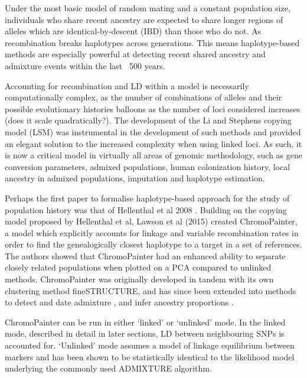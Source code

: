 

Under the most basic model of random mating and a constant population size, individuals who share recent ancestry are expected to share longer regions of alleles which are identical-by-descent (IBD) than those who do not. As recombination breaks haplotypes across generations. This means haplotype-based methods are especially powerful at detecting recent shared ancestry and admixture events within the last ~500 years.
 
Accounting for recombination and LD within a model is necessarily computationally complex, as the number of combinations of alleles and their possible evolutionary histories balloons as the number of loci considered increases (does it scale quadratically?). The development of the Li and Stephens copying model (LSM) \cite{Li2003} was instrumental in the development of such methods \cite{song2016li} and provided an elegant solution to the increased complexity when using linked loci. As such, it is now a critical model in virtually all areas of genomic methodology, such as gene conversion parameters, admixed populations, human colonization history, local ancestry in admixed populations, imputation and haplotype estimation. 

Perhaps the first paper to formalise  haplotype-based approach for the study of population history was that of Hellenthal et al 2008 \cite{hellenthal2008inferring}. Building on the copying model proposed by Hellenthal et al, Lawson et al (2015) \cite{Lawson2012} created ChromoPainter, a model which explicitly accounts for linkage and variable recombination rates in order to find the genealogically closest haplotype to a target in a set of references. The authors showed that ChromoPainter had an enhanced ability to separate closely related populations when plotted on a PCA compared to unlinked methods. ChromoPainter was originally developed in tandem with its own clustering method fineSTRUCTURE, and has since been extended into methods to detect and date admixture \cite{Hellenthal2014}, and infer ancestry proportions \cite{Chacon-Duque2018}. 

ChromoPainter can be run in either `linked' or `unlinked' mode. In the linked mode, described in detail in later sections, LD between neighbouring SNPs is accounted for. `Unlinked' mode assumes a model of linkage equilibrium between markers and has been shown to be statistically identical to the likelihood model underlying the commonly used ADMIXTURE algorithm. 

